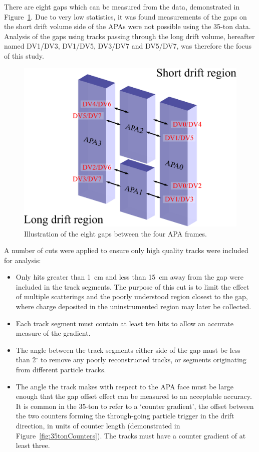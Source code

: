 There are eight gaps which can be measured from the data, demonstrated in Figure~\ref{fig:APAGapCrossingGaps}.  Due to very low statistics, it was found measurements of the gaps on the short drift volume side of the APAs were not possible using the 35-ton data.  Analysis of the gaps using tracks passing through the long drift volume, hereafter named DV1/DV3, DV1/DV5, DV3/DV7 and DV5/DV7, was therefore the focus of this study.

\begin{figure}
  \centering
  \includegraphics[width=12cm]{APAGapCrossingGaps.eps}
  \caption{Illustration of the eight gaps between the four APA frames.}
  \label{fig:APAGapCrossingGaps}
\end{figure}

A number of cuts were applied to ensure only high quality tracks were included for analysis:
\begin{itemize}
  \item{Only hits greater than 1~cm and less than 15~cm away from the gap were included in the track segments.  The purpose of this cut is to limit the effect of multiple scatterings and the poorly understood region closest to the gap, where charge deposited in the uninstrumented region may later be collected.}
  \item{Each track segment must contain at least ten hits to allow an accurate measure of the gradient.}
  \item{The angle between the track segments either side of the gap must be less than 2$^\circ$ to remove any poorly reconstructed tracks, or segments originating from different particle tracks.}
  \item{The angle the track makes with respect to the APA face must be large enough that the gap offset effect can be measured to an acceptable accuracy.  It is common in the 35-ton to refer to a `counter gradient', the offset between the two counters forming the through-going particle trigger in the drift direction, in units of counter length (demonstrated in Figure~\ref{fig:35tonCounters}).  The tracks must have a counter gradient of at least three.}
\end{itemize}

